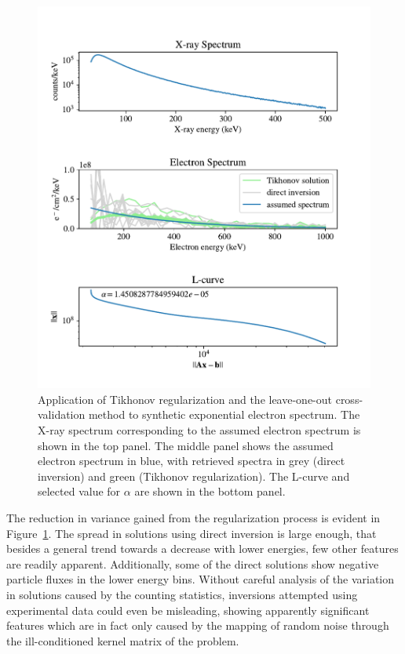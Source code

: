 \begin{figure}[p]
\label{l-curve-example}
    \centering
    \includegraphics[width=\textwidth]{figures/chapter_4/l-curve-example/L_curve_example_5.pdf}
    \caption{Application of Tikhonov regularization and the leave-one-out cross-validation method to synthetic exponential electron spectrum. The X-ray spectrum corresponding to the assumed electron spectrum is shown in the top panel. The middle panel shows the assumed electron spectrum in blue, with retrieved spectra in grey (direct inversion) and green (Tikhonov regularization). The L-curve and selected value for $\alpha$ are shown in the bottom panel. }
    \label{l-curve-example}
\end{figure}

The reduction in variance gained from the regularization process is evident in Figure~\ref{l-curve-example}. The spread in solutions using direct inversion is large enough, that besides a general trend towards a decrease with lower energies, few other features are readily apparent. Additionally, some of the direct solutions show negative particle fluxes in the lower energy bins. Without careful analysis of the variation in solutions caused by the counting statistics, inversions attempted using experimental data could even be misleading, showing apparently significant features which are in fact only caused by the mapping of random noise through the ill-conditioned kernel matrix of the problem. 

